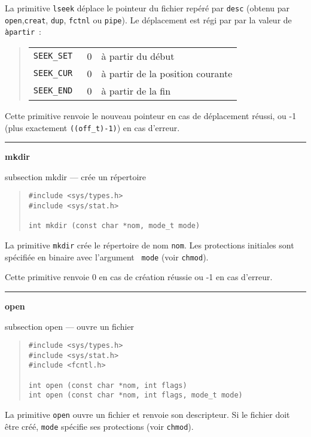 \documentclass [twoside] {report}
\newcommand {\primitive} [1]
    {
	{\large \bf #1}
	\addcontentsline {toc} {subsection} {#1}
    }
\newcommand {\separation}
    {
	\vspace {7mm}
	\nopagebreak
	\hrule
    }
\begin{document}
La primitive {\tt lseek} déplace le pointeur du
fichier repéré par {\tt desc} (obtenu par
{\tt open},{\tt creat}, {\tt dup}, {\tt fctnl} ou {\tt pipe}).
Le déplacement est régi par par la valeur de
{\tt àpartir}~:

\begin {quote}
    \begin {tabular} {|lll|} \hline
	\tt SEEK\_SET & 0 & à partir du début \\
	\tt SEEK\_CUR & 0 & à partir de la position courante \\
	\tt SEEK\_END & 0 & à partir de la fin \\ \hline
    \end {tabular}
\end {quote}

Cette primitive renvoie le nouveau pointeur en cas
de déplacement réussi, ou -1 (plus exactement \verb|((off_t)-1)|)
en cas d'erreur.




\separation
\primitive {mkdir} --- crée un répertoire

\begin {quote}
\begin {verbatim}
#include <sys/types.h>
#include <sys/stat.h>

int mkdir (const char *nom, mode_t mode)
\end{verbatim}
\end {quote}

La primitive {\tt mkdir} crée le répertoire de nom {\tt nom}. Les 
protections initiales sont spécifiée en binaire avec l'argument {\tt
mode} (voir {\tt chmod}).

Cette primitive renvoie 0 en cas de création réussie
ou -1 en cas d'erreur.




\separation
\primitive {open} --- ouvre un fichier

\begin {quote}
\begin {verbatim}
#include <sys/types.h>
#include <sys/stat.h>
#include <fcntl.h>

int open (const char *nom, int flags)
int open (const char *nom, int flags, mode_t mode)
\end{verbatim}
\end {quote}

La primitive {\tt open} ouvre un fichier et renvoie
son descripteur. Si le fichier doit être créé,
{\tt mode} spécifie ses protections (voir {\tt chmod}).
\end{document}
